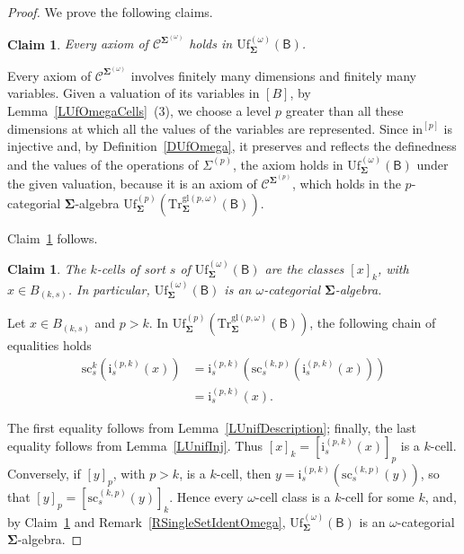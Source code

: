 \documentclass[a4paper, reqno
]{amsart}
\newcommand{\sig}[1]{\mathbf{#1}}             %
\newcommand{\calg}[1]{\boldsymbol{\mathsf{#1}}} %
\newcommand{\spec}[1]{\boldsymbol{\mathcal{#1}}} %
\newcommand{\gl}{\mathrm{gl}}                %
\newcommand{\src}{\mathrm{sc}}
\newcommand{\Uf}{\mathrm{Uf}}
\newcommand{\Tr}{\mathrm{Tr}}
\theoremstyle{plain}
\newtheorem{claim}[theorem]{Claim}
\theoremstyle{definition}
\begin{document}
\begin{proof}
We prove the following claims.

\begin{claim}\label{CUfOmegaA}
Every axiom of $\spec{C}^{\sig{\Sigma}^{(\omega)}}$ holds in $\Uf^{(\omega)}_{\sig{\Sigma}}(\calg{B})$.
\end{claim}

Every axiom of $\spec{C}^{\sig{\Sigma}^{(\omega)}}$ involves finitely many dimensions and finitely many variables.
Given a valuation of its variables in $[B]$, by Lemma~\ref{LUfOmegaCells}~(3), we choose a level $p$ greater than all these dimensions at which all the values of the variables are represented.
Since $\mathrm{in}^{[p]}$ is injective and, by Definition~\ref{DUfOmega}, it preserves and reflects the definedness and the values of the operations of $\Sigma^{(p)}$, the axiom holds in $\Uf^{(\omega)}_{\sig{\Sigma}}(\calg{B})$ under the given valuation, because it is an axiom of $\spec{C}^{\sig{\Sigma}^{(p)}}$, which holds in the $p$-categorial $\sig{\Sigma}$-algebra $\Uf^{(p)}_{\sig{\Sigma}}(\Tr^{\gl(p,\omega)}_{\sig{\Sigma}}(\calg{B}))$.

Claim~\ref{CUfOmegaA} follows.

\begin{claim}\label{CUfOmegaB}
The $k$-cells of sort $s$ of $\Uf^{(\omega)}_{\sig{\Sigma}}(\calg{B})$ are the classes $[x]_{k}$, with $x\in B_{(k,s)}$.
In particular, $\Uf^{(\omega)}_{\sig{\Sigma}}(\calg{B})$ is an $\omega$-categorial $\sig{\Sigma}$-algebra.
\end{claim}

Let $x\in B_{(k,s)}$ and $p>k$.
In $\Uf^{(p)}_{\sig{\Sigma}}(\Tr^{\gl(p,\omega)}_{\sig{\Sigma}}(\calg{B}))$, the following chain of equalities holds
\begin{align*}
\src^{k}_{s}\left(\mathrm{i}^{(p,k)}_{s}(x)\right)
&=
\mathrm{i}^{(p,k)}_{s}\left(\src^{(k,p)}_{s}\left(\mathrm{i}^{(p,k)}_{s}(x)\right)\right)
\tag{1}
\\&=
\mathrm{i}^{(p,k)}_{s}(x).
\tag{2}
\end{align*}

The first equality follows from Lemma~\ref{LUnifDescription}; finally, the last equality follows from Lemma~\ref{LUnifInj}.
Thus $[x]_{k}=[\mathrm{i}^{(p,k)}_{s}(x)]_{p}$ is a $k$-cell.
Conversely, if $[y]_{p}$, with $p>k$, is a $k$-cell, then $y=\mathrm{i}^{(p,k)}_{s}(\src^{(k,p)}_{s}(y))$, so that $[y]_{p}=[\src^{(k,p)}_{s}(y)]_{k}$.
Hence every $\omega$-cell class is a $k$-cell for some $k$, and, by Claim~\ref{CUfOmegaA} and Remark~\ref{RSingleSetIdentOmega}, $\Uf^{(\omega)}_{\sig{\Sigma}}(\calg{B})$ is an $\omega$-categorial $\sig{\Sigma}$-algebra.


\end{proof}
\end{document}
